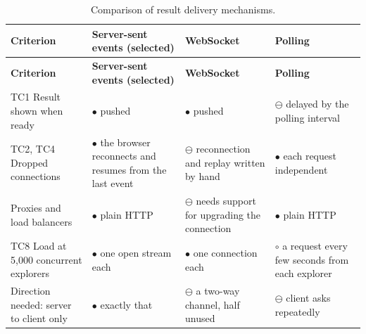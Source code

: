 {\small
\begin{longtable}{|>{\raggedright\arraybackslash}p{}|>{\raggedright\arraybackslash}p{}|>{\raggedright\arraybackslash}p{}|>{\raggedright\arraybackslash}p{}|}
\caption{Comparison of result delivery mechanisms.} \\
\hline
\textbf{Criterion} & \textbf{Server-sent events (selected)} & \textbf{WebSocket\cite{r176}} & \textbf{Polling} \\ \hline
\endfirsthead
\hline
\textbf{Criterion} & \textbf{Server-sent events (selected)} & \textbf{WebSocket\cite{r176}} & \textbf{Polling} \\ \hline
\endhead
TC1 Result shown when ready & $\bullet$ pushed & $\bullet$ pushed & $\ominus$ delayed by the polling interval \\ \hline
TC2, TC4 Dropped connections & $\bullet$ the browser reconnects and resumes from the last event\cite{r144} & $\ominus$ reconnection and replay written by hand & $\bullet$ each request independent \\ \hline
Proxies and load balancers & $\bullet$ plain HTTP & $\ominus$ needs support for upgrading the connection & $\bullet$ plain HTTP \\ \hline
TC8 Load at 5,000 concurrent explorers & $\bullet$ one open stream each & $\bullet$ one connection each & $\circ$ a request every few seconds from each explorer \\ \hline
Direction needed: server to client only & $\bullet$ exactly that & $\ominus$ a two-way channel, half unused & $\ominus$ client asks repeatedly \\ \hline
\end{longtable}
}

